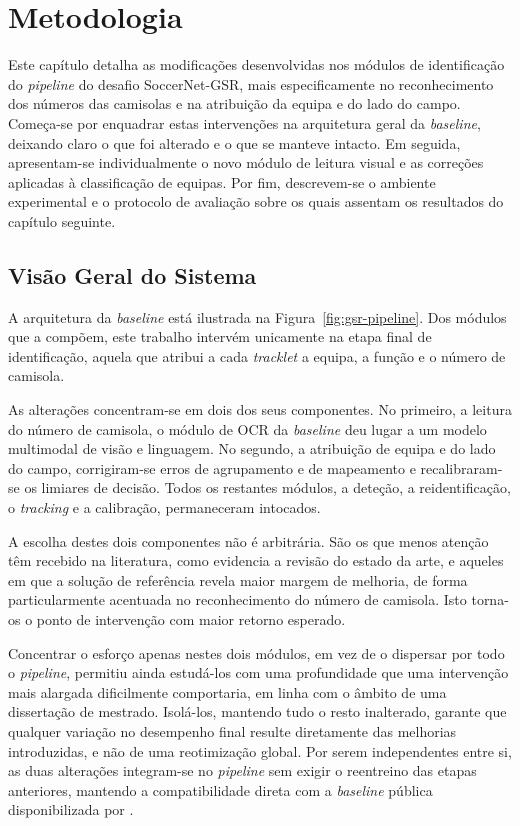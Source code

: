\chapter{Metodologia}\label{cap:metodologia}

Este capítulo detalha as modificações desenvolvidas nos módulos de identificação do
\emph{pipeline} do desafio SoccerNet-GSR, mais especificamente no reconhecimento dos
números das camisolas e na atribuição da equipa e do lado do campo. Começa-se por enquadrar
estas intervenções na arquitetura geral da \emph{baseline}, deixando claro o que foi alterado
e o que se manteve intacto. Em seguida, apresentam-se individualmente o novo módulo de leitura
visual e as correções aplicadas à classificação de equipas. Por fim, descrevem-se o ambiente
experimental e o protocolo de avaliação sobre os quais assentam os resultados do capítulo
seguinte.


\section{Visão Geral do Sistema}

A arquitetura da \emph{baseline} está ilustrada na Figura~\ref{fig:gsr-pipeline}. Dos módulos
que a compõem, este trabalho intervém unicamente na etapa final de identificação, aquela que
atribui a cada \emph{tracklet} a equipa, a função e o número de camisola.

As alterações concentram-se em dois dos seus componentes. No primeiro, a leitura do número de
camisola, o módulo de OCR da \emph{baseline} deu lugar a um modelo multimodal de visão e
linguagem. No segundo, a atribuição de equipa e do lado do campo, corrigiram-se erros de
agrupamento e de mapeamento e recalibraram-se os limiares de decisão. Todos os restantes
módulos, a deteção, a reidentificação, o \emph{tracking} e a calibração, permaneceram intocados.

A escolha destes dois componentes não é arbitrária. São os que menos atenção têm recebido na
literatura, como evidencia a revisão do estado da arte, e aqueles em que a solução de referência
revela maior margem de melhoria, de forma particularmente acentuada no reconhecimento do número de
camisola. Isto torna-os o ponto de intervenção com maior retorno esperado.

Concentrar o esforço apenas nestes dois módulos, em vez de o dispersar por todo o \emph{pipeline},
permitiu ainda estudá-los com uma profundidade que uma intervenção mais alargada dificilmente
comportaria, em linha com o âmbito de uma dissertação de mestrado. Isolá-los, mantendo tudo o resto
inalterado, garante que qualquer variação no desempenho final resulte diretamente das melhorias
introduzidas, e não de uma reotimização global. Por serem independentes entre si, as duas
alterações integram-se no \emph{pipeline} sem exigir o reentreino das etapas anteriores, mantendo a
compatibilidade direta com a \emph{baseline} pública disponibilizada por \citet{somers2024soccernet}.

